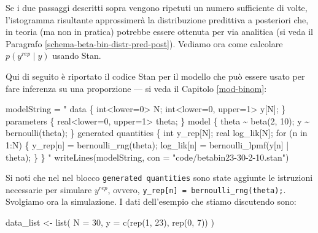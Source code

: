 \documentclass[
  10pt,
  italian,
  a4paper,
  extrafontsizes,onecolumn,openright
  ]{memoir}
\newenvironment{Shaded}{\begin{snugshade}}{\end{snugshade}}
\newcommand{\AttributeTok}[1]{\textcolor[rgb]{0.77,0.63,0.00}{#1}}
\newcommand{\DecValTok}[1]{\textcolor[rgb]{0.00,0.00,0.81}{#1}}
\newcommand{\FunctionTok}[1]{\textcolor[rgb]{0.00,0.00,0.00}{#1}}
\newcommand{\NormalTok}[1]{#1}
\newcommand{\OtherTok}[1]{\textcolor[rgb]{0.56,0.35,0.01}{#1}}
\newcommand{\StringTok}[1]{\textcolor[rgb]{0.31,0.60,0.02}{#1}}
\begin{document}
\noindent
Se i due passaggi descritti sopra vengono ripetuti un numero sufficiente di volte, l'istogramma risultante approssimerà la distribuzione predittiva a posteriori che, in teoria (ma non in pratica) potrebbe essere ottenuta per via analitica (si veda il Paragrafo \ref{schema-beta-bin-distr-pred-post}). Vediamo ora come calcolare \(p(y^{rep} \mid y)\) usando Stan.

Qui di seguito è riportato il codice Stan per il modello che può essere usato per fare inferenza su una proporzione --- si veda il Capitolo \ref{mod-binom}:

\begin{Shaded}
\begin{Highlighting}[]
\NormalTok{modelString }\OtherTok{=} \StringTok{"}
\StringTok{data \{}
\StringTok{  int\textless{}lower=0\textgreater{} N;}
\StringTok{  int\textless{}lower=0, upper=1\textgreater{} y[N];}
\StringTok{\}}
\StringTok{parameters \{}
\StringTok{  real\textless{}lower=0, upper=1\textgreater{} theta;}
\StringTok{\}}
\StringTok{model \{}
\StringTok{  theta \textasciitilde{} beta(2, 10);}
\StringTok{  y \textasciitilde{} bernoulli(theta);}
\StringTok{\}}
\StringTok{generated quantities \{}
\StringTok{  int y\_rep[N];}
\StringTok{  real log\_lik[N];}
\StringTok{  for (n in 1:N) \{}
\StringTok{    y\_rep[n] = bernoulli\_rng(theta);}
\StringTok{    log\_lik[n] = bernoulli\_lpmf(y[n] | theta);}
\StringTok{  \}}
\StringTok{\}}
\StringTok{"}
\FunctionTok{writeLines}\NormalTok{(modelString, }\AttributeTok{con =} \StringTok{"code/betabin23{-}30{-}2{-}10.stan"}\NormalTok{)}
\end{Highlighting}
\end{Shaded}

\noindent
Si noti che nel nel blocco \texttt{generated\ quantities} sono state aggiunte le istruzioni necessarie per simulare \(y^{rep}\), ovvero, \texttt{y\_rep{[}n{]}\ =\ bernoulli\_rng(theta);}. Svolgiamo ora la simulazione. I dati dell'esempio che stiamo discutendo sono:

\begin{Shaded}
\begin{Highlighting}[]
\NormalTok{data\_list }\OtherTok{\textless{}{-}} \FunctionTok{list}\NormalTok{(}
  \AttributeTok{N =} \DecValTok{30}\NormalTok{,}
  \AttributeTok{y =} \FunctionTok{c}\NormalTok{(}\FunctionTok{rep}\NormalTok{(}\DecValTok{1}\NormalTok{, }\DecValTok{23}\NormalTok{), }\FunctionTok{rep}\NormalTok{(}\DecValTok{0}\NormalTok{, }\DecValTok{7}\NormalTok{))}
\NormalTok{)}
\end{Highlighting}
\end{Shaded}
\end{document}
